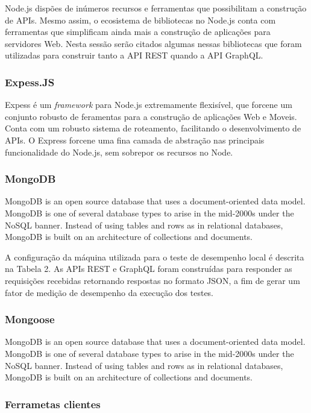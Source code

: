 Node.js dispões de inúmeros recursos e ferramentas que possibilitam a construção de APIs. Mesmo assim, o ecosistema de bibliotecas no Node.js conta com ferramentas que simplificam ainda mais a construção de aplicações para servidores Web. Nesta sessão serão citados algumas nessas bibliotecas que foram utilizadas para construir tanto a API REST quando a API GraphQL.

\subsubsection*{Expess.JS}

Expess é um \textit{framework} para Node.js extremamente flexisível, que forcene um conjunto robusto de feramentas para a construção de aplicações Web e Moveis. Conta com um robusto sistema de roteamento, facilitando o desenvolvimento de APIs. O Express forcene uma fina camada de abstração nas principais funcionalidade do Node.js, sem sobrepor os recursos no Node.

\subsubsection*{MongoDB}

MongoDB is an open source database that uses a document-oriented data model. MongoDB is one of several database types to arise in the mid-2000s under the NoSQL banner. Instead of using tables and rows as in relational databases, MongoDB is built on an architecture of collections and documents.

A configuração da máquina utilizada para o teste de desempenho local é descrita na Tabela 2. As APIs REST e GraphQL foram construídas para responder as requisições recebidas retornando respostas no formato JSON, a fim de gerar um fator de medição de desempenho da execução dos testes.

\subsubsection*{Mongoose}

MongoDB is an open source database that uses a document-oriented data model. MongoDB is one of several database types to arise in the mid-2000s under the NoSQL banner. Instead of using tables and rows as in relational databases, MongoDB is built on an architecture of collections and documents.

\subsubsection*{Ferrametas clientes}

